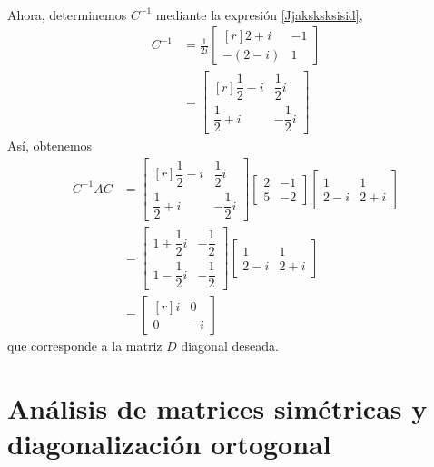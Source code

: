 \begin{example}
\begin{align*}
    \end{align*}\newpage\noindent
    Ahora, determinemos $C^{-1}$ mediante la expresión \ref{Jjaksksksisid},
    \begin{align*}
        C^{-1} & = \frac{1}{2i} \begin{bmatrix*}[r]
            2 + i & - 1 \\
            -(2 - i) & 1
        \end{bmatrix*} \\
        & = \begin{bmatrix*}[r]
            \dfrac{1}{2} - i & \dfrac{1}{2}i \\[2mm]
            \dfrac{1}{2} + i & - \dfrac{1}{2}i
        \end{bmatrix*}
    \end{align*}
    Así, obtenemos
    \begin{align*}
        C^{-1}AC & = \begin{bmatrix*}[r]
            \dfrac{1}{2} - i & \dfrac{1}{2}i \\[2mm]
            \dfrac{1}{2} + i & - \dfrac{1}{2}i
        \end{bmatrix*} \begin{bmatrix*}
            2 & - 1 \\
            5 & - 2
        \end{bmatrix*} \begin{bmatrix}
            1 & 1 \\
            2 - i & 2 + i
        \end{bmatrix} \\
        & = \begin{bmatrix}
            1 + \dfrac{1}{2}i & - \dfrac{1}{2} \\[2mm]
            1 - \dfrac{1}{2}i & - \dfrac{1}{2}
        \end{bmatrix} \begin{bmatrix}
            1 & 1 \\
            2 - i & 2 + i
        \end{bmatrix} \\
        & = \begin{bmatrix*}[r]
            i & 0 \\
            0 & - i
        \end{bmatrix*}
    \end{align*}
    que corresponde a la matriz $D$ diagonal deseada.
\end{example}

\section{Análisis de matrices simétricas y diagonalización ortogonal}


